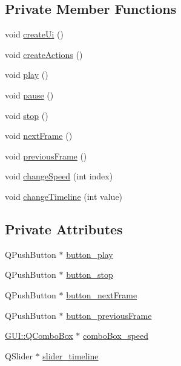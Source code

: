 \subsection*{Private Member Functions}
\begin{DoxyCompactItemize}
\item 
void \hyperlink{classGUI_1_1PlayerControlPanel_aa72182c9a958af0e87b65ab7bdba0035}{create\+Ui} ()
\item 
void \hyperlink{classGUI_1_1PlayerControlPanel_a5176c9496a29e21eacb0f81ca1a29923}{create\+Actions} ()
\item 
void \hyperlink{classGUI_1_1PlayerControlPanel_a6d58098c6cf63c241ed03bc797256bb1}{play} ()
\item 
void \hyperlink{classGUI_1_1PlayerControlPanel_a7167f5c196fc5e167bfabde1a730e81d}{pause} ()
\item 
void \hyperlink{classGUI_1_1PlayerControlPanel_a8c528baf37154d347366083f0f816846}{stop} ()
\item 
void \hyperlink{classGUI_1_1PlayerControlPanel_a365329da56f8b07f8c95027ba967bbc3}{next\+Frame} ()
\item 
void \hyperlink{classGUI_1_1PlayerControlPanel_a3c96ed37c70ebc0b32c527a04e1536d1}{previous\+Frame} ()
\item 
void \hyperlink{classGUI_1_1PlayerControlPanel_a5589e2287b95a33fb20081ea7332e9bf}{change\+Speed} (int index)
\item 
void \hyperlink{classGUI_1_1PlayerControlPanel_a8941b919cc55ba59b57f9d10e92b5a9e}{change\+Timeline} (int value)
\end{DoxyCompactItemize}
\subsection*{Private Attributes}
\begin{DoxyCompactItemize}
\item 
Q\+Push\+Button $\ast$ \hyperlink{classGUI_1_1PlayerControlPanel_aef3bac87f4b1a474e7962687db36070b}{button\+\_\+play}
\item 
Q\+Push\+Button $\ast$ \hyperlink{classGUI_1_1PlayerControlPanel_ac0235f183b389c9d592bc70287f97e73}{button\+\_\+stop}
\item 
Q\+Push\+Button $\ast$ \hyperlink{classGUI_1_1PlayerControlPanel_a13676b392df866080d4a9a0b42f0c8a8}{button\+\_\+next\+Frame}
\item 
Q\+Push\+Button $\ast$ \hyperlink{classGUI_1_1PlayerControlPanel_a94ca89bf967e4f6fab20899a9e03347e}{button\+\_\+previous\+Frame}
\item 
\hyperlink{classGUI_1_1QComboBox}{G\+U\+I\+::\+Q\+Combo\+Box} $\ast$ \hyperlink{classGUI_1_1PlayerControlPanel_a4981ab9117345fbe6cc663dec8dc2c01}{combo\+Box\+\_\+speed}
\item 
Q\+Slider $\ast$ \hyperlink{classGUI_1_1PlayerControlPanel_a18cb8efd82db13d946e30a9579b76817}{slider\+\_\+timeline}
\end{DoxyCompactItemize}
